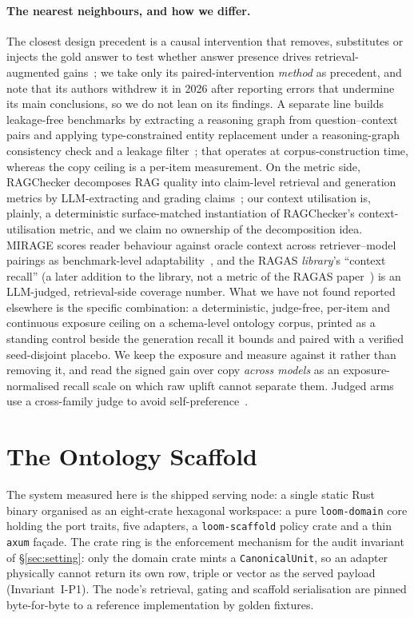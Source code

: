 \documentclass[10pt,twocolumn]{article}
\begin{document}
\paragraph{The nearest neighbours, and how we differ.}
The closest design precedent is a causal intervention that removes, substitutes or injects the gold
answer to test whether answer presence drives retrieval-augmented gains~\cite{answerpresence2026}; we
take only its paired-intervention \emph{method} as precedent, and note that its authors withdrew it in
2026 after reporting errors that undermine its main conclusions, so we do not lean on its findings. A
separate line builds leakage-free benchmarks by extracting a reasoning graph from question--context
pairs and applying type-constrained entity replacement under a reasoning-graph consistency check and a
leakage filter~\cite{seedrg2026}; that operates at corpus-construction time, whereas the copy ceiling
is a per-item measurement. On the metric side, RAGChecker decomposes RAG quality into claim-level
retrieval and generation metrics by LLM-extracting and grading claims~\cite{ragchecker2024}; our
context utilisation is, plainly, a deterministic surface-matched instantiation of RAGChecker's
context-utilisation metric, and we claim no ownership of the decomposition idea. MIRAGE scores
reader behaviour against oracle context across retriever--model pairings as benchmark-level
adaptability~\cite{mirage2025}, and the RAGAS \emph{library}'s ``context recall'' (a later addition to
the library, not a metric of the RAGAS paper~\cite{es2023ragas}) is an LLM-judged, retrieval-side
coverage number. What we have not found reported elsewhere is the specific combination: a
deterministic, judge-free, per-item and continuous exposure ceiling on a schema-level ontology corpus,
printed as a standing control beside the generation recall it bounds and paired with a verified
seed-disjoint placebo. We keep the exposure and measure against it rather than removing it, and read
the signed gain over copy \emph{across models} as an exposure-normalised recall scale on which raw
uplift cannot separate them. Judged arms use a cross-family judge to avoid
self-preference~\cite{zheng2023judging,panickssery2024selfpreference}.

\section{The Ontology Scaffold}\label{sec:system}
The system measured here is the shipped serving node: a single static Rust binary organised as an
eight-crate hexagonal workspace: a pure \texttt{loom-domain} core holding the port traits, five
adapters, a \texttt{loom-scaffold} policy crate and a thin \texttt{axum} façade. The crate ring is
the enforcement mechanism for the audit invariant of \S\ref{sec:setting}: only the domain crate
mints a \texttt{CanonicalUnit}, so an adapter physically cannot return its own row, triple or vector
as the served payload (Invariant~I-P1). The node's retrieval, gating and scaffold serialisation are
pinned byte-for-byte to a reference implementation by golden fixtures.
\end{document}
